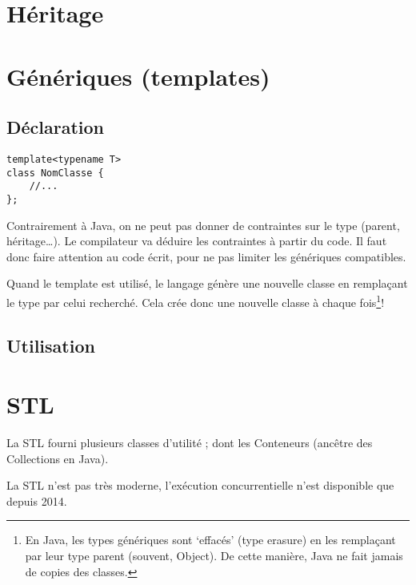 \documentclass[10pt,a4paper,french]{article}
\begin{document}
\section{Héritage}

\section{Génériques (templates)}

\subsection{Déclaration}

\begin{verbatim}
template<typename T>
class NomClasse {
    //...
};
\end{verbatim}

Contrairement à Java, on ne peut pas donner de contraintes sur le type (parent, héritage\ldots). Le compilateur va déduire les contraintes à partir du code. Il faut donc faire attention au code écrit, pour ne pas limiter les génériques compatibles.

Quand le template est utilisé, le langage génère une nouvelle classe en remplaçant le type par celui recherché. Cela crée donc une nouvelle classe à chaque fois\footnote{En Java, les types génériques sont `effacés' (type erasure) en les remplaçant par leur type parent (souvent, Object). De cette manière, Java ne fait jamais de copies des classes.}!

\subsection{Utilisation}

\section{STL}

La STL fourni plusieurs classes d'utilité ; dont les Conteneurs (ancêtre des Collections en Java).

La STL n'est pas très moderne, l'exécution concurrentielle n'est disponible que depuis 2014.

\appendix %

\end{document}
